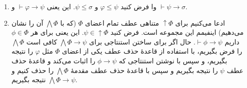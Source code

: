 \begin{ans}
    \begin{enumerate}[label=(\alph*)]
        \item 
        وا
        فرض کنید
        $\varphi\leq\psi$
        و
        $\psi\leq\sigma$.
        این یعنی
        $\vdash\varphi\to\psi$
        و
        $\vdash\psi\to\sigma$.
        \item ادعا می‌کنیم برای
        $\uparrow\Phi$
        متناهی عطف تمام اعضای
        $\Phi$
        (که با
        $\bigwedge\Phi$
        آن را نشان می‌دهیم)
        اینفیمم این مجموعه است.
        فرض کنید
        $\psi\in\uparrow\Phi$.
        این یعنی برای هر
        $\phi\in\Phi$
        داریم
        $\vdash\phi\to\psi$.
        حال اگر برای ساختن استنتاجی برای
        $\bigwedge\Phi\to\psi$
        کافی است
        $\bigwedge\Phi$
        را فرض بگیریم، با استفاده از قاعدهٔ حذف عطف یکی از اعضای
        $\Phi$
        مثل
        $\varphi$
        را نتیجه بگیریم، و سپس با نوشتن استنتاجی که
        $\phi\to\psi$
        را اثبات می‌کند و قاعدهٔ حذف عطف
        $\psi$
        را نتیجه بگیریم و سپس با قاعدهٔ حذف عطف مقدمهٔ
        $\bigwedge\Phi$
        را حذف کنیم و نتیجه بگیریم
        $\bigwedge\Phi\to\psi$.
    \end{enumerate}
\end{ans}